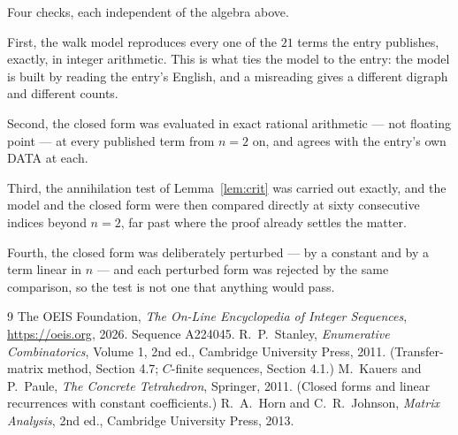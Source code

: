 \documentclass[11pt,a4paper]{article}
\theoremstyle{plain}
\theoremstyle{definition}
\begin{document}
Four checks, each independent of the algebra above.

First, the walk model reproduces every one of the $21$ terms the entry publishes,
exactly, in integer arithmetic. This is what ties the model to the entry: the model is built
by reading the entry's English, and a misreading gives a different digraph and different
counts.

Second, the closed form was evaluated in exact rational arithmetic --- not floating point ---
at every published term from $n=2$ on, and agrees with the entry's own DATA at each.

Third, the annihilation test of Lemma~\ref{lem:crit} was carried out exactly, and the model
and the closed form were then compared directly at sixty consecutive indices beyond
$n=2$, far past where the proof already settles the matter.

Fourth, the closed form was deliberately perturbed --- by a constant and by a term linear in
$n$ --- and each perturbed form was rejected by the same comparison, so the test is not one
that anything would pass.

\begin{thebibliography}{9}
 The OEIS Foundation, \emph{The On-Line Encyclopedia of Integer
Sequences}, \url{https://oeis.org}, 2026. Sequence A224045.
 R.~P.~Stanley, \emph{Enumerative Combinatorics}, Volume 1, 2nd ed.,
Cambridge University Press, 2011. (Transfer-matrix method, Section 4.7; $C$-finite sequences,
Section 4.1.)
 M.~Kauers and P.~Paule, \emph{The Concrete Tetrahedron}, Springer, 2011.
(Closed forms and linear recurrences with constant coefficients.)
 R.~A.~Horn and C.~R.~Johnson, \emph{Matrix Analysis}, 2nd ed., Cambridge
University Press, 2013.
\end{thebibliography}
\end{document}

